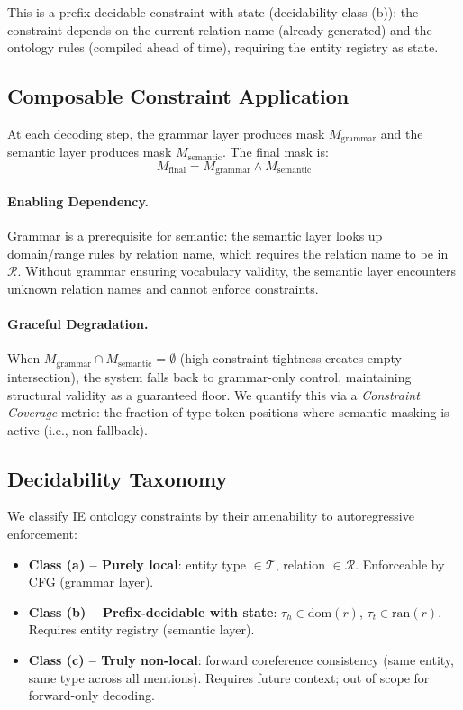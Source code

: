 \documentclass[11pt,a4paper]{article}
\begin{document}
This is a prefix-decidable constraint with state (decidability class (b)): the constraint depends on the current relation name (already generated) and the ontology rules (compiled ahead of time), requiring the entity registry as state.

\subsection{Composable Constraint Application}
\label{sec:composition}

At each decoding step, the grammar layer produces mask $M_{\text{grammar}}$ and the semantic layer produces mask $M_{\text{semantic}}$. The final mask is:
\begin{equation}
M_{\text{final}} = M_{\text{grammar}} \wedge M_{\text{semantic}}
\end{equation}

\paragraph{Enabling Dependency.} Grammar is a prerequisite for semantic: the semantic layer looks up domain/range rules by relation name, which requires the relation name to be in $\mathcal{R}$. Without grammar ensuring vocabulary validity, the semantic layer encounters unknown relation names and cannot enforce constraints.

\paragraph{Graceful Degradation.} When $M_{\text{grammar}} \cap M_{\text{semantic}} = \emptyset$ (high constraint tightness creates empty intersection), the system falls back to grammar-only control, maintaining structural validity as a guaranteed floor. We quantify this via a \emph{Constraint Coverage} metric: the fraction of type-token positions where semantic masking is active (i.e., non-fallback).

\subsection{Decidability Taxonomy}
\label{sec:decidability}

We classify IE ontology constraints by their amenability to autoregressive enforcement:

\begin{itemize}
\item \textbf{Class (a) -- Purely local}: entity type $\in \mathcal{T}$, relation $\in \mathcal{R}$. Enforceable by CFG (grammar layer).
\item \textbf{Class (b) -- Prefix-decidable with state}: $\tau_h \in \text{dom}(r)$, $\tau_t \in \text{ran}(r)$. Requires entity registry (semantic layer).
\item \textbf{Class (c) -- Truly non-local}: forward coreference consistency (same entity, same type across all mentions). Requires future context; out of scope for forward-only decoding.
\end{itemize}
\end{document}
